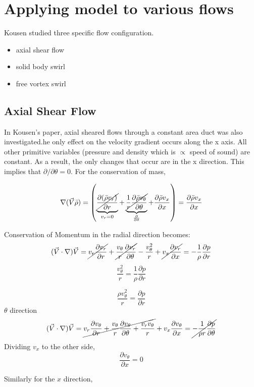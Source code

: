 \section{Applying model to various flows}
Kousen studied three specific flow configuration.

\begin{itemize}
	\item axial shear flow
	\item solid body swirl
	\item free vortex swirl
\end{itemize}
\subsection{Axial Shear Flow}
In Kousen's paper, axial sheared flows through a constant area duct was also investigated.he only effect on the velocity gradient occurs along the x axis. All other primitive variables (pressure and density which is $\propto$ speed of sound) are constant. As a result, the only changes that occur are in the x direction. This implies that $\partial / \partial \theta = 0$. For the conservation of mass,

\[ \nabla (\vec{V}\bar{\rho}) =  \left( 
\underbrace{
	\cancel{
		\frac{\partial (\bar{\rho}v_r)	}{\partial r}
	}
}_{v_r = 0} +
\underbrace{\cancel{\frac{1}{r}	\frac{\partial \bar{\rho}v_{\theta}}{\partial \theta}}}_{\frac{\partial }{\partial \theta}} +
\frac{\partial \bar{\rho}v_x}{\partial x}
\right) = \frac{\partial \bar{\rho}v_x}{\partial x}\] 

Conservation of Momentum in the radial direction becomes:
\[(\vec{V}\cdot \nabla) \vec{V} =
\cancel{v_r \frac{\partial v_r}{\partial r}} +
\cancel{\frac{v_{\theta}  }{r}
	\frac{\partial v_r}{\partial \theta}}- \frac{v_{\theta}^2}{r}+ 
\cancel{v_x \frac{\partial v_r}{\partial x} }
= -\frac{1}{\rho} \frac{\partial p}{\partial r}
\]
\[
\frac{v_{\theta}^2}{r}
= \frac{1}{\rho} \frac{\partial p}{\partial r}
\] 

\[
\frac{{\rho} v_{\theta}^2}{r} 
=\frac{\partial p}{\partial r}
\]
$\theta$ direction
\[(\vec{V}\cdot \nabla) \vec{V} = \cancel{v_r \frac{\partial v_{\theta}}{\partial r} +
	\frac{v_{\theta}}{r}
	\frac{\partial v_{\theta}}{\partial \theta} +
	\frac{v_r v_{\theta}}{r}}+ 
v_x \frac{\partial v_{\theta}}{\partial x} 
= \cancel{-\frac{1}{\rho r} \frac{\partial p}{\partial \theta}}\]
Dividing $v_x$ to the other side,
\[ \frac{\partial v_{\theta}}{\partial x}  = 0\]

Similarly for the $x$ direction,

